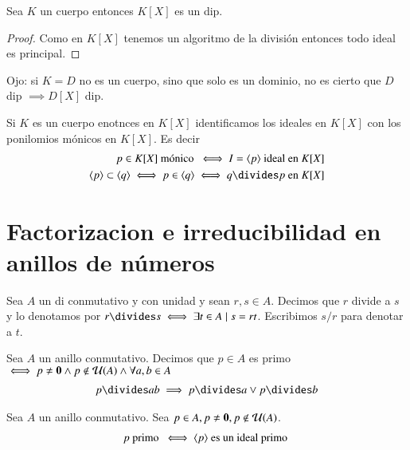 \begin{pro}
	Sea $K$ un cuerpo entonces $K[X]$ es un \gls{dip}.
\end{pro}

\begin{proof}
	Como en $K[X]$ tenemos un algoritmo de la división entonces todo ideal es principal.
\end{proof}

\begin{obs}
	Ojo: si $K = D$ no es un cuerpo, sino que solo es un dominio, no es cierto que $D$ \gls{dip} $\implies D[X]$ \gls{dip}.
\end{obs}

\begin{cor}
	Si $K$ es un cuerpo enotnces en $K[X]$ identificamos los ideales en $K[X]$ con los ponilomios mónicos en $K[X]$. Es decir
	\begin{align*}
		p \in K[X] \text{ mónico } \iff I = \gen{p} \text{ ideal en } K[X] \\
		\gen{p} \subset \gen{q} \iff p \in \gen{q} \iff q \divides p \text{ en } K[X]
	\end{align*}
\end{cor}

\section{Factorizacion e irreducibilidad en anillos de números}

\begin{dfn}[Divisibilidad]
	Sea $A$ un \gls{di} conmutativo y con unidad y sean $r,s \in A$. Decimos que $r$ divide a $s$ y lo denotamos por $r \divides s \iff \exists t \in A \mid s = rt$. Escribimos $s/r$ para denotar a $t$.
\end{dfn}

\begin{dfn}[Primo] %
	Sea $A$ un anillo conmutativo. Decimos que $p \in A$ es primo $\iff p \neq \mathbf{0} \land p \notin \mathcal{U}(A) \land \forall a,b \in A$
	\begin{align*}
	p \divides ab \implies p \divides a \lor p \divides b
	\end{align*}
\end{dfn}

\begin{pro}
	Sea $A$ un anillo conmutativo. Sea $p \in A, p \neq \mathbf{0}, p \notin \mathcal{U}(A)$.
	\begin{align*}
	p \text{ primo } \iff \langle p\rangle \text{ es un ideal primo }
	\end{align*}
\end{pro}

